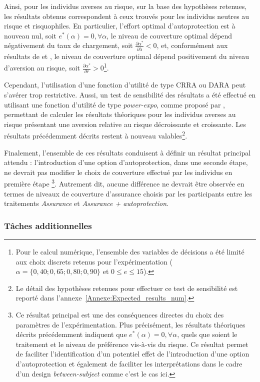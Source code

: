 \begin{Article}
\begin{refsection}[Mouminoux]
Ainsi, pour les individus averses au risque, sur la base des hypothèses retenues, les résultats obtenus correspondent à ceux trouvés pour les individus neutres au risque et risquophiles. En particulier, l'effort optimal d'autoprotection est à nouveau nul, soit $e^*(\alpha)=0, \forall \alpha$, le niveau de couverture optimal dépend négativement du taux de chargement, soit $\frac{\partial \alpha^*}{\partial \lambda}<0$, et, conformément aux résultats de \textcite{m68} et \textcite{s00}, le niveau de couverture optimal dépend positivement du niveau d'aversion au risque, soit $\frac{\partial \alpha^*}{\partial r}>0$\footnote{Pour le calcul numérique, l'ensemble des variables de décisions a été limité aux choix discrets retenus pour l'expérimentation ($\alpha = \{0,40;0,65;0,80;0,90\}$ et $0 \le e \le 15$).}.

Cependant, l'utilisation d'une fonction d'utilité de type CRRA ou DARA peut s'avérer trop restrictive. Aussi, un test de sensibilité des résultats a été effectué en utilisant une fonction d'utilité de type \og \textit{power-expo}\fg, comme proposé par \textcite{hl02}, permettant de calculer les résultats théoriques pour les individus averses au risque présentant une aversion relative au risque décroissante et croissante. Les résultats précédemment décrits restent à nouveau valables\footnote{Le détail des hypothèses retenues pour effectuer ce test de sensibilité est reporté dans l'annexe~\ref{Annexe:Expected_results_num}.}.

Finalement, l'ensemble de ces résultats conduisent à définir un résultat principal attendu : l'introduction d'une option d'autoprotection, dans une seconde étape, ne devrait pas modifier le choix de couverture effectué par les individus en première étape \footnote{Ce résultat principal est une des conséquences directes du choix des paramètres de l'expérimentation. Plus précisément, les résultats théoriques décrits précédemment indiquent que $e^*(\alpha) = 0, \forall \alpha$, quels que soient le traitement et le niveau de préférence vis-à-vis du risque. Ce résultat permet de faciliter l'identification d'un potentiel effet de l'introduction d'une option d'autoprotection et également de faciliter les interprétations dans le cadre d'un design \textit{between-subject} comme c'est le cas ici.}. Autrement dit, aucune différence ne devrait être observée en termes de niveaux de couverture d'assurance choisis par les participants entre les traitements \textit{Assurance} et \textit{Assurance + autoprotection}.


\subsubsection{Tâches additionnelles}


\end{refsection}
\end{Article}
